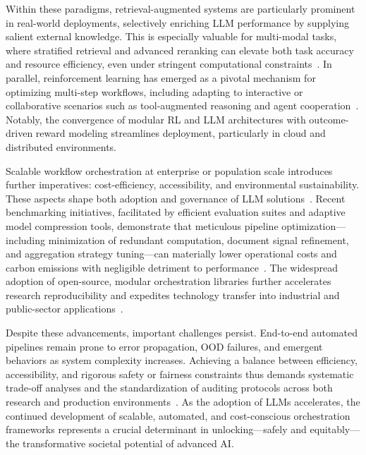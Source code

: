 \documentclass[11pt]{article}
\begin{document}
Within these paradigms, retrieval-augmented systems are particularly prominent in real-world deployments, selectively enriching LLM performance by supplying salient external knowledge. This is especially valuable for multi-modal tasks, where stratified retrieval and advanced reranking can elevate both task accuracy and resource efficiency, even under stringent computational constraints~\cite{ref:79,ref:80,ref:89}. In parallel, reinforcement learning has emerged as a pivotal mechanism for optimizing multi-step workflows, including adapting to interactive or collaborative scenarios such as tool-augmented reasoning and agent cooperation~\cite{ref:8,ref:9,ref:12,ref:37,ref:55,ref:60,ref:64,ref:86}. Notably, the convergence of modular RL and LLM architectures with outcome-driven reward modeling streamlines deployment, particularly in cloud and distributed environments.

Scalable workflow orchestration at enterprise or population scale introduces further imperatives: cost-efficiency, accessibility, and environmental sustainability. These aspects shape both adoption and governance of LLM solutions~\cite{ref:37,ref:43,ref:55,ref:88,ref:104}. Recent benchmarking initiatives, facilitated by efficient evaluation suites and adaptive model compression tools, demonstrate that meticulous pipeline optimization—including minimization of redundant computation, document signal refinement, and aggregation strategy tuning—can materially lower operational costs and carbon emissions with negligible detriment to performance~\cite{ref:43,ref:55,ref:88,ref:104}. The widespread adoption of open-source, modular orchestration libraries further accelerates research reproducibility and expedites technology transfer into industrial and public-sector applications~\cite{ref:37,ref:43,ref:79,ref:86}.

Despite these advancements, important challenges persist. End-to-end automated pipelines remain prone to error propagation, OOD failures, and emergent behaviors as system complexity increases. Achieving a balance between efficiency, accessibility, and rigorous safety or fairness constraints thus demands systematic trade-off analyses and the standardization of auditing protocols across both research and production environments~\cite{ref:8,ref:43,ref:80,ref:104}. As the adoption of LLMs accelerates, the continued development of scalable, automated, and cost-conscious orchestration frameworks represents a crucial determinant in unlocking—safely and equitably—the transformative societal potential of advanced AI.
\end{document}
